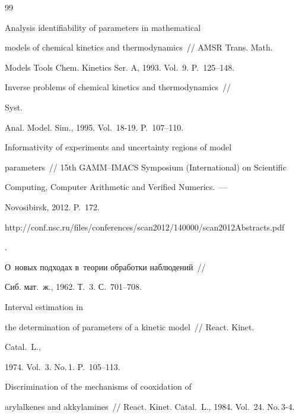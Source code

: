 {\small\frenchspacing

{%


\begin{thebibliography}{99}


 Analysis identifiability of parameters in mathematical 

models of chemical kinetics and thermodynamics~/\!\!/ AMSR Trans. Math. 

Models  Tools Chem. Kinetics Ser. A, 1993. Vol.~9. P.~125--148.


 Inverse problems of chemical kinetics and thermodynamics~/\!\!/ 

Syst. 

Anal. Model. Sim., 1995. Vol.~18-19. P.~107--110.


 Informativity of experiments and uncertainty regions of model 

parameters~/\!\!/ 15th GAMM--IMACS Symposium (International) on Scientific 

Computing, Computer Arithmetic and Verified Numerics.~---

Novosibirsk, 2012. P.~172. {\sf 

http://conf.nsc.ru/files/conferences/scan2012/140000/scan2012Abstracts.pdf}.


 О~новых подходах в~теории обработки наблюдений~/\!\!/ 

Сиб. мат.~ж., 1962. Т.~3. С.~701--708.


 Interval estimation in 

the determination of parameters of a kinetic model~/\!\!/ React. Kinet. 

Catal.~L., 

1974. Vol.~3. No.\,1. P.~105--113.


 Discrimination of the mechanisms of cooxidation of 

arylalkenes and akkylamines~/\!\!/ React. Kinet. Catal.~L., 1984. Vol.~24. No.\,3-4. 


\end{thebibliography}}}
